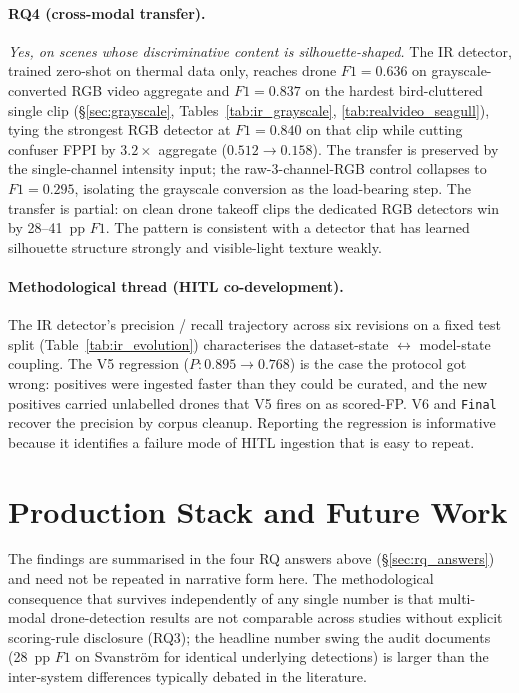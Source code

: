 \documentclass[12pt,a4paper,oneside,openright]{book}
\begin{document}
\paragraph{RQ4 (cross-modal transfer).}
\emph{Yes, on scenes whose discriminative content is silhouette-shaped.} The IR detector, trained zero-shot on thermal data only, reaches drone $F1=0.636$ on grayscale-converted RGB video aggregate and $F1=0.837$ on the hardest bird-cluttered single clip (\S\ref{sec:grayscale}, Tables~\ref{tab:ir_grayscale}, \ref{tab:realvideo_seagull}), tying the strongest RGB detector at $F1=0.840$ on that clip while cutting confuser FPPI by $3.2\times$ aggregate ($0.512 \to 0.158$). The transfer is preserved by the single-channel intensity input; the raw-3-channel-RGB control collapses to $F1=0.295$, isolating the grayscale conversion as the load-bearing step. The transfer is partial: on clean drone takeoff clips the dedicated RGB detectors win by 28--41~pp $F1$. The pattern is consistent with a detector that has learned silhouette structure strongly and visible-light texture weakly.

\paragraph{Methodological thread (HITL co-development).}
The IR detector's precision / recall trajectory across six revisions on a fixed test split (Table~\ref{tab:ir_evolution}) characterises the dataset-state $\leftrightarrow$ model-state coupling. The V5 regression ($P: 0.895 \to 0.768$) is the case the protocol got wrong: positives were ingested faster than they could be curated, and the new positives carried unlabelled drones that V5 fires on as scored-FP. V6 and \texttt{Final} recover the precision by corpus cleanup. Reporting the regression is informative because it identifies a failure mode of HITL ingestion that is easy to repeat.

\section{Production Stack and Future Work}
\label{sec:production_stack}


The findings are summarised in the four RQ answers above (\S\ref{sec:rq_answers}) and need not be repeated in narrative form here. The methodological consequence that survives independently of any single number is that multi-modal drone-detection results are not comparable across studies without explicit scoring-rule disclosure (RQ3); the headline number swing the audit documents (28~pp $F1$ on Svanstr\"om for identical underlying detections) is larger than the inter-system differences typically debated in the literature.
\end{document}
